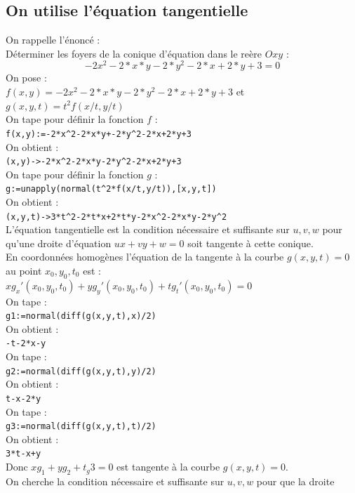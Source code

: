 \documentclass[a4paper,11pt]{book}
\begin{document}
\subsection{On utilise l'\'equation tangentielle}
On rappelle l'\'enonc\'e :\\
D\'eterminer les foyers de la conique d'\'equation dans le re\`ere $Oxy$ :
$$-2x^2-2*x*y-2*y^2-2*x+2*y+3=0$$
On pose :\\
$f(x,y)=-2x^2-2*x*y-2*y^2-2*x+2*y+3$ et \\
$g(x,y,t)=t^2f(x/t,y/t)$\\
On tape pour d\'efinir la fonction $f$ :\\
{\tt f(x,y):=-2*x\verb|^|2-2*x*y+-2*y\verb|^|2-2*x+2*y+3}\\
On obtient :\\
{\tt  (x,y)->-2*x\verb|^|2-2*x*y-2*y\verb|^|2-2*x+2*y+3}\\
On tape  pour d\'efinir la fonction $g$ :\\
{\tt g:=unapply(normal(t\verb|^|2*f(x/t,y/t)),[x,y,t])}\\
On obtient :\\
{\tt  (x,y,t)->3*t\verb|^|2-2*t*x+2*t*y-2*x\verb|^|2-2*x*y-2*y\verb|^|2}\\
L'\'equation tangentielle est la condition n\'ecessaire et suffisante sur
$u,v,w$ pour qu'une droite d'\'equation $ux+vy+w=0$ soit tangente \`a cette 
conique.\\
En coordonn\'ees homog\`enes l'\'equation de la tangente \`a la courbe 
$g(x,y,t)=0$ au point $x_0,y_0,t_0$ est :\\
$xg_x'(x_0,y_0,t_0)+yg_y'(x_0,y_0,t_0)+tg_t'(x_0,y_0,t_0)=0$\\
On tape :\\
{\tt g1:=normal(diff(g(x,y,t),x)/2)}\\
On obtient :\\
{\tt -t-2*x-y}\\
On tape :\\
{\tt g2:=normal(diff(g(x,y,t),y)/2)}\\
On obtient :\\
{\tt t-x-2*y}\\
On tape :\\
{\tt g3:=normal(diff(g(x,y,t),t)/2)}\\
On obtient :\\
{\tt 3*t-x+y}\\
Donc $xg_1+yg_2+t_g3=0$ est tangente \`a la courbe $g(x,y,t)=0$.\\
On cherche la 
condition  n\'ecessaire et suffisante sur $u,v,w$ pour que la droite 
\end{document}
